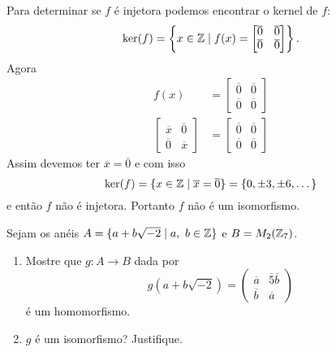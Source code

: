 \documentclass[12pt]{exam}
\begin{document}
\begin{enumerate}[label=({\alph*})]
        Para determinar se $f$ é injetora podemos encontrar o kernel de $f$:
        \[
            \ker(f) = \left\{x \in \mathbb{Z} \mid f(x) = \begin{bmatrix}
                \overline{0} & \overline{0}\\\overline{0} & \overline{0}
            \end{bmatrix}\right\}.
        \]
        Agora
        \begin{align*}
            f(x) &= \begin{bmatrix}
                \overline{0} & \overline{0}\\\overline{0} & \overline{0}
            \end{bmatrix}\\
            \begin{bmatrix}
                \overline{x} & \overline{0}\\\overline{0} & \overline{x}
            \end{bmatrix} &= \begin{bmatrix}
            \overline{0} & \overline{0}\\\overline{0} & \overline{0}
            \end{bmatrix}
        \end{align*}
        Assim devemos ter $\overline{x} = \overline{0}$ e com isso
        \[
            \ker(f) = \{x \in \mathbb{Z} \mid \overline{x} = \overline{0}\} = \{0, \pm 3, \pm 6, \dots\}
        \]
        e então $f$ não é injetora. Portanto $f$ não é um isomorfismo.
    \end{enumerate}
    \vspace{.4cm}

    \questao Sejam os anéis $A = \{ a + b\sqrt{-2} \mid a,\ b \in \mathbb{Z}\}$ e $B = M_2(\mathbb{Z}_7)$.
    \begin{enumerate}[label=({\alph*})]
        \item Mostre que $g : A \to B$ dada por
        \[
            g(a + b\sqrt{-2}) =
            \begin{pmatrix}
                \overline{a} & \overline{5}\overline{b}\\
                \overline{b} & \overline{a}
            \end{pmatrix}
        \]
        é um homomorfismo.

        \item $g$ é um isomorfismo? Justifique.
    \end{enumerate}
    \vspace{1cm}
\end{document}
